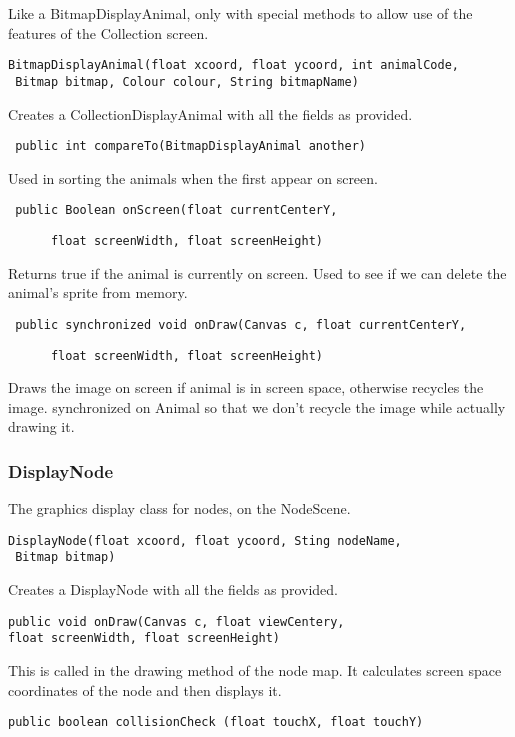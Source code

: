 \documentclass[12pt,a4paper,twoside]{article}
\begin{document}
Like a BitmapDisplayAnimal, only with special methods to allow use of the features of the Collection screen.

\begin{verbatim}
BitmapDisplayAnimal(float xcoord, float ycoord, int animalCode,
 Bitmap bitmap, Colour colour, String bitmapName)
\end{verbatim}

Creates a CollectionDisplayAnimal with all the fields as provided.

\verb£ public int compareTo(BitmapDisplayAnimal another)£

Used in sorting the animals when the first appear on screen.

\verb£ public Boolean onScreen(float currentCenterY, £

 \verb£		 float screenWidth, float screenHeight)£

Returns true if the animal is currently on screen. Used to see if we can delete the animal's sprite from memory.

\verb£ public synchronized void onDraw(Canvas c, float currentCenterY,£

\verb£ 		float screenWidth, float screenHeight)£

Draws the image on screen if animal is in screen space, otherwise recycles the image. synchronized on Animal so that we don't recycle the image while actually drawing it.

\subsubsection{DisplayNode}

The graphics display class for nodes, on the NodeScene.

\begin{verbatim}
DisplayNode(float xcoord, float ycoord, Sting nodeName,
 Bitmap bitmap)
\end{verbatim}

Creates a DisplayNode with all the fields as provided.

\begin{verbatim}
public void onDraw(Canvas c, float viewCentery, 
float screenWidth, float screenHeight)
\end{verbatim}

This is called in the drawing method of the node map. It calculates screen space coordinates of the node and then displays it.

\verb£public boolean collisionCheck (float touchX, float touchY)£
\end{document}
